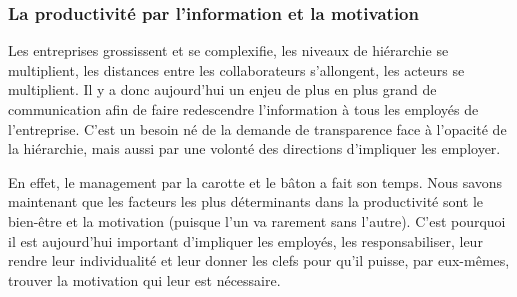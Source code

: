 \subsubsection{La productivité par l'information et la motivation}

Les entreprises grossissent et se complexifie, les niveaux de hiérarchie se multiplient, les distances entre les collaborateurs s'allongent, les acteurs se multiplient. Il y a donc aujourd'hui un enjeu de plus en plus grand de communication afin de faire redescendre l'information à tous les employés de l'entreprise. C'est un besoin né de la demande de transparence face à l'opacité de la hiérarchie, mais aussi par une volonté des directions d'impliquer les employer.

En effet, le management par la carotte et le bâton a fait son temps. Nous savons maintenant que les facteurs les plus déterminants dans la productivité sont le bien-être et la motivation (puisque l'un va rarement sans l'autre). C'est pourquoi il est aujourd'hui important d'impliquer les employés, les responsabiliser, leur rendre leur individualité et leur donner les clefs pour qu'il puisse, par eux-mêmes, trouver la motivation qui leur est nécessaire.

\clearpage
